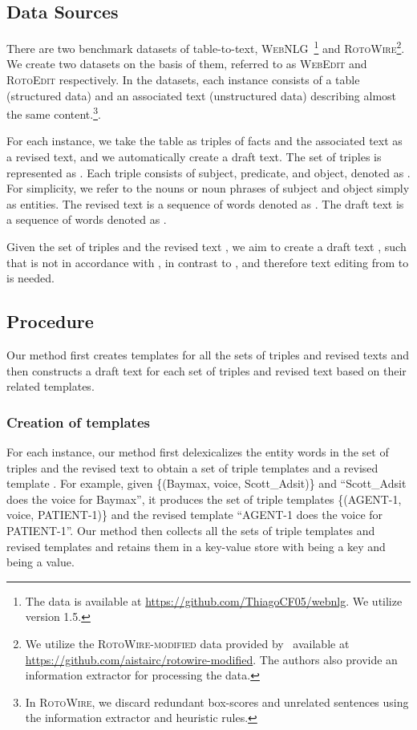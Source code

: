 \documentclass[11pt,a4paper]{article}
\begin{document}
\subsection{Data Sources}
There are two benchmark datasets of table-to-text, \textsc{WebNLG}~\cite{gardent-etal-2017-creating}\footnote{The data is available at \url{https://github.com/ThiagoCF05/webnlg}. We utilize version 1.5.} and \textsc{RotoWire}\cite{wiseman2017challenges}\footnote{We utilize the \textsc{RotoWire-modified} data provided by~\citet{iso2019learning} available at \url{https://github.com/aistairc/rotowire-modified}. The authors also provide an information extractor for processing the data.}. We create two datasets on the basis of them, referred to as \textsc{WebEdit} and \textsc{RotoEdit} respectively. In the datasets, each instance consists of a table (structured data) and an associated text (unstructured data) describing almost the same content.\footnote{In \textsc{RotoWire}, we discard redundant box-scores and unrelated sentences using the information extractor and heuristic rules. }.  

For each instance, we take the table as triples of facts and the associated text as a revised text, and we automatically create a draft text. The set of triples is represented as . Each triple  consists of subject, predicate, and object, denoted as . For simplicity, we refer to the nouns or noun phrases of subject and object simply as entities. The revised text is a sequence of words denoted as . The draft text is a sequence of words denoted as . 

Given the set of triples  and the revised text , we aim to create a draft text , such that  is not in accordance with , in contrast to , and therefore text editing from  to  is needed.

\subsection{Procedure}

Our method first creates templates for all the sets of triples and revised texts and then constructs a draft text for each set of triples and revised text based on their related templates.

\subsubsection*{Creation of templates}

For each instance, our method first delexicalizes the entity words in the set of triples  and the revised text  to obtain a set of triple templates  and a revised template . For example, given \{(Baymax, voice, Scott\_Adsit)\} and ``Scott\_Adsit does the voice for Baymax'', it produces the set of triple templates \{(AGENT-1, voice, PATIENT-1)\} and the revised template ``AGENT-1 does the voice for PATIENT-1''.
Our method then collects all the sets of triple templates  and revised templates  and retains them in a key-value store with  being a key and  being a value.
\end{document}
